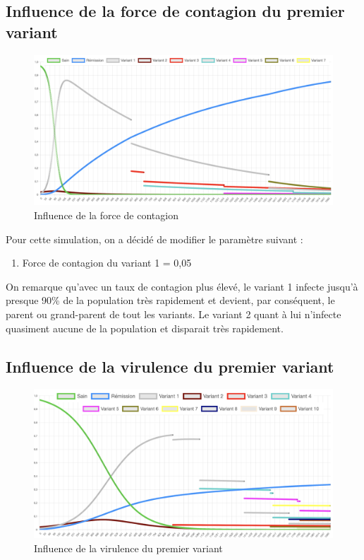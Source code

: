 \documentclass{article}
\begin{document}
\subsection{Influence de la force de contagion du premier variant}

\begin{figure}[h]
    \includegraphics[width=\linewidth]{images/Simulation3.png}
    \caption{Influence de la force de contagion}
    \label{fig:simulation3}
\end{figure}

Pour cette simulation, on a décidé de modifier le paramètre suivant :
\begin{enumerate}
    \item Force de contagion du variant 1 = 0,05 \\
\end{enumerate}
\noindent

On remarque qu'avec un taux de contagion plus élevé, le variant 1 infecte jusqu'à presque 90\% de la population très rapidement et devient, par conséquent, le parent ou grand-parent de tout les variants. Le variant 2 quant à lui n'infecte quasiment aucune de la population et disparait très rapidement. \\

\subsection{Influence de la virulence du premier variant}

\begin{figure}[h]
    \includegraphics[width=\linewidth]{images/Simulation4.png}
    \caption{Influence de la virulence du premier variant}
    \label{fig:simulation4}
\end{figure}
\end{document}
